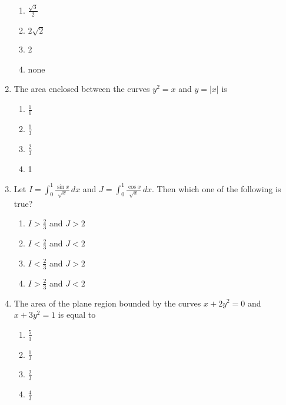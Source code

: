 \documentclass[journal]{IEEEtran}
\begin{document}
\begin{enumerate}
    		   \hfill {}
		   \begin{enumerate}
		      \item $\frac{\sqrt{3}}{2}$
		      \item $2\sqrt{2}$
		      \item 2
		      \item none
		   \end{enumerate} 
	   \item 
		  The area enclosed between the curves $y^{2}=x$ and $y=|x|$ is
		 \hfill {}
		 \begin{enumerate}
		     \item $\frac{1}{6}$
		     \item $\frac{1}{3}$
		     \item $\frac{2}{3}$
		     \item 1
		 \end{enumerate}
	   \item 
		 Let $I=\int_{0}^{1} \frac{\sin x}{\sqrt{x}} \,dx$ and $J=\int_{0}^{1} \frac{\cos x}{\sqrt{x}} \,dx$. Then which one of the following is true?
		\hfill {} 
		\begin{enumerate}
		    \item $I>\frac{2}{3}$ and $J>2$
		    \item $I<\frac{2}{3}$ and $J<2$
		    \item $I<\frac{2}{3}$ and $J>2$
		    \item $I>\frac{2}{3}$ and $J<2$
		\end{enumerate}
	   \item 
		 The area of the plane region bounded by the curves $x+2y^{2}=0$ and $x+3y^{2}=1$ is equal to  
		\hfill {}
		\begin{enumerate}
		   \item $\frac{5}{3}$
		   \item $\frac{1}{3}$
		   \item $\frac{2}{3}$
		   \item $\frac{4}{3}$
		\end{enumerate}
	\end{enumerate}
	
\end{document}
